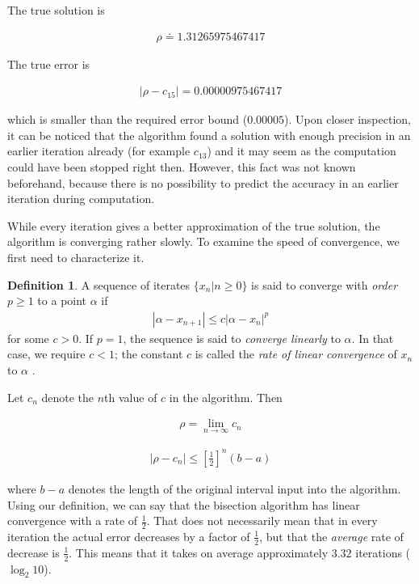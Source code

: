 \documentclass[
  digital, %
  table,   %
  nolof,     %
  nolot,     %
	draft, %
]{fithesis3}
\begin{document}
The true solution is

\begin{align}
      \rho \doteq 1.31265975467417
\end{align}

The true error is

\begin{align}
      |\rho - c_{15}| = 0.00000975467417
\end{align}

which is smaller than the required error bound ($0.00005$). Upon closer inspection, it can be noticed that the algorithm found a solution with enough precision in an earlier iteration already (for example $c_{13}$) and it may seem as the computation could have been stopped right then. However, this fact was not known beforehand, because there is no possibility to predict the accuracy in an earlier iteration during computation.

While every iteration gives a better approximation of the true solution, the algorithm is converging rather slowly. To examine the speed of convergence, we first need to characterize it.

\theoremstyle{definition}
\newtheorem{definition}{Definition}

\begin{definition}
  A sequence of iterates $\{ x_{n} | n \geq 0\}$ is said to converge with \textit{order $p \geq 1$} to a point $\alpha$ if
	\begin{align}
      |\alpha - x_{n + 1}| \leq c |\alpha - x_{n}|^{p}  \tag*{$n \geq 0$} 
	\end{align}
	for some $c > 0$. If $p = 1$, the sequence is said to \textit{converge linearly} to $\alpha$. In that case, we require $c < 1$; the constant $c$ is called the \textit{rate of linear convergence} of $x_{n}$ to $\alpha$ \parencite[p.~56]{rootApproxMeth}.
\end{definition}


Let $c_{n}$ denote the $n$th value of $c$ in the algorithm. Then 

\begin{align}
      \rho = \lim_{n\to\infty} c_{n}
\end{align}

\begin{align}
      |\rho - c_{n}| \leq \left[\frac{1}{2}\right]^n (b - a)
\end{align}

where $b - a$ denotes the length of the original interval input into the algorithm. Using our definition, we can say that the bisection algorithm has linear convergence with a rate of $\frac{1}{2}$. That does not necessarily mean that in every iteration the actual error decreases by a factor of $\frac{1}{2}$, but that the \textit{average} rate of decrease is $\frac{1}{2}$. This means that it takes on average approximately $3.32$ iterations ($\log_2 10$).
\end{document}
